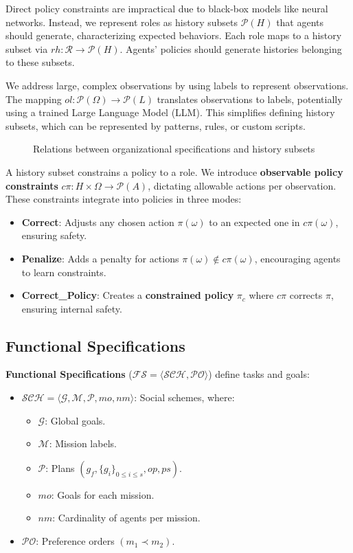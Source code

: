 Direct policy constraints are impractical due to black-box models like neural networks. Instead, we represent roles as history subsets $\mathcal{P}(H)$ that agents should generate, characterizing expected behaviors. Each role maps to a history subset via $rh: \mathcal{R} \rightarrow \mathcal{P}(H)$. Agents' policies should generate histories belonging to these subsets.

We address large, complex observations by using labels to represent observations. The mapping $ol: \mathcal{P}(\Omega) \rightarrow \mathcal{P}(L)$ translates observations to labels, potentially using a trained Large Language Model (LLM). This simplifies defining history subsets, which can be represented by patterns, rules, or custom scripts.

\begin{figure}[h!]
  \centering
  
  \caption{Relations between organizational specifications and history subsets}
  \label{fig:PRAHOM_osm_rels}
\end{figure}

A history subset constrains a policy to a role. We introduce \textbf{observable policy constraints} $c\pi: H \times \Omega \rightarrow \mathcal{P}(A)$, dictating allowable actions per observation. These constraints integrate into policies in three modes:
\begin{itemize}
  \item \textbf{Correct}: Adjusts any chosen action $\pi(\omega)$ to an expected one in $c\pi(\omega)$, ensuring safety.
  \item \textbf{Penalize}: Adds a penalty for actions $\pi(\omega) \notin c\pi(\omega)$, encouraging agents to learn constraints.
  \item \textbf{Correct\_Policy}: Creates a \textbf{constrained policy} $\pi_c$ where $c\pi$ corrects $\pi$, ensuring internal safety.
\end{itemize}

\subsection{Functional Specifications}

\textbf{Functional Specifications} ($\mathcal{FS} = \langle \mathcal{SCH}, \mathcal{PO} \rangle$) define tasks and goals:
\begin{itemize}
  \item $\mathcal{SCH} = \langle \mathcal{G}, \mathcal{M}, \mathcal{P}, mo, nm \rangle$: Social schemes, where:
        \begin{itemize}
          \item $\mathcal{G}$: Global goals.
          \item $\mathcal{M}$: Mission labels.
          \item $\mathcal{P}$: Plans $(g_f, \{g_i\}_{0 \leq i \leq s}, op, ps)$.
          \item $mo$: Goals for each mission.
          \item $nm$: Cardinality of agents per mission.
        \end{itemize}
  \item $\mathcal{PO}$: Preference orders $(m_1 \prec m_2)$.
\end{itemize}

